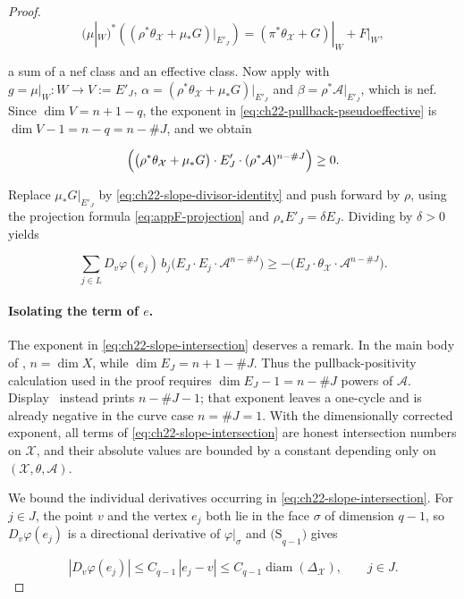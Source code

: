 \begin{proof}
\[
 (\mu|_W)^*\!\left(
   (\rho^*\theta_{\mathcal X}+\mu_*G)|_{E'_J}\right)
   =(\pi^*\theta_{\mathcal X}+G)|_W+F|_W,
\tag{22.46}\label{eq:ch22-nef-effective-decomposition}
\]

a sum of a nef class and an effective class.  Now apply
 with $g=\mu|_W:W\to V:=E'_J$,
$\alpha=(\rho^*\theta_{\mathcal X}+\mu_*G)|_{E'_J}$ and
$\beta=\rho^*\mathcal A|_{E'_J}$, which is nef.  Since
$\dim V=n+1-q$, the exponent in
\eqref{eq:ch22-pullback-pseudoeffective} is $\dim V-1=n-q=n-\#J$, and we
obtain

\[
 \Bigl(\bigl(\rho^*\theta_{\mathcal X}+\mu_*G\bigr)\cdot E'_J\cdot
       (\rho^*\mathcal A)^{n-\#J}\Bigr)\geq0 .
\]

Replace $\mu_*G|_{E'_J}$ by \eqref{eq:ch22-slope-divisor-identity} and
push forward by $\rho$, using the projection formula
\eqref{eq:appF-projection} and $\rho_*E'_J=\delta E_J$.  Dividing by
$\delta>0$ yields

\[
 \sum_{j\in L}D_v\varphi(e_j)\,b_j
       \bigl(E_J\cdot E_j\cdot\mathcal A^{n-\#J}\bigr)
 \geq
 -\bigl(E_J\cdot\theta_{\mathcal X}\cdot
                         \mathcal A^{n-\#J}\bigr).
\tag{22.47}\label{eq:ch22-slope-intersection}
\]

\paragraph{Isolating the term of $e$.}
The exponent in \eqref{eq:ch22-slope-intersection} deserves a remark.  In
the main body of \cite{BFJ16}, $n=\dim X$, while
$\dim E_J=n+1-\#J$.  Thus the pullback-positivity calculation used in
the proof requires $\dim E_J-1=n-\#J$ powers of $\mathcal A$.
Display~\cite[(6.3)]{BFJ16} instead prints $n-\#J-1$; that exponent leaves
a one-cycle and is already negative in the curve case
$n=\#J=1$.  With the dimensionally corrected exponent, all terms of
\eqref{eq:ch22-slope-intersection} are honest intersection numbers on
$\mathcal X$, and their absolute values are bounded by a constant
depending only on $(\mathcal X,\theta,\mathcal A)$.

We bound the individual derivatives occurring in
\eqref{eq:ch22-slope-intersection}.  For $j\in J$, the point $v$ and the
vertex $e_j$ both lie in the face $\sigma$ of dimension $q-1$, so
$D_v\varphi(e_j)$ is a directional derivative of
$\varphi|_\sigma$ and $\mathrm{(S}_{q-1}\mathrm{)}$ gives

\[
 |D_v\varphi(e_j)|\leq C_{q-1}\,|e_j-v|\leq C_{q-1}\operatorname{diam}
       (\Delta_{\mathcal X}),
 \qquad j\in J .
\tag{22.48}\label{eq:ch22-inductive-derivative-bound}
\]


\end{proof}

